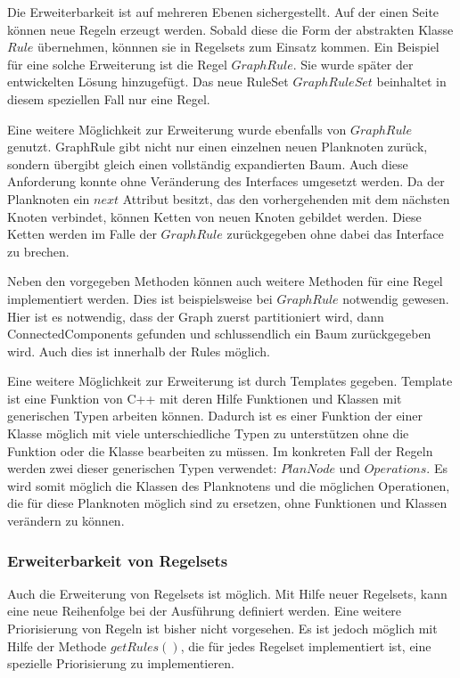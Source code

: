 Die Erweiterbarkeit ist auf mehreren Ebenen sichergestellt. Auf der einen Seite können neue Regeln erzeugt werden. Sobald diese die Form der abstrakten Klasse $Rule$ übernehmen, könnnen sie in Regelsets zum Einsatz kommen. Ein Beispiel für eine solche Erweiterung ist die Regel $GraphRule$. Sie wurde später der entwickelten Lösung hinzugefügt. Das neue RuleSet $GraphRuleSet$ beinhaltet in diesem speziellen Fall nur eine Regel.

Eine weitere Möglichkeit zur Erweiterung wurde ebenfalls von $GraphRule$ genutzt. GraphRule gibt nicht nur einen einzelnen neuen Planknoten zurück, sondern übergibt gleich einen vollständig expandierten Baum. Auch diese Anforderung konnte ohne Veränderung des Interfaces umgesetzt werden. Da der Planknoten ein $next$ Attribut besitzt, das den vorhergehenden mit dem nächsten Knoten verbindet, können Ketten von neuen Knoten gebildet werden. Diese Ketten werden im Falle der $GraphRule$ zurückgegeben ohne dabei das Interface zu brechen.

Neben den vorgegeben Methoden können auch weitere Methoden für eine Regel implementiert werden. Dies ist beispielsweise bei $GraphRule$ notwendig gewesen. Hier ist es notwendig, dass der Graph zuerst partitioniert wird, dann ConnectedComponents gefunden und schlussendlich ein Baum zurückgegeben wird. Auch dies ist innerhalb der Rules möglich.

Eine weitere Möglichkeit zur Erweiterung ist durch Templates gegeben. Template ist eine Funktion von C++ mit deren Hilfe Funktionen und Klassen mit generischen Typen arbeiten können. Dadurch ist es einer Funktion der einer Klasse möglich mit viele unterschiedliche Typen zu unterstützen ohne die Funktion oder die Klasse bearbeiten zu müssen. Im konkreten Fall der Regeln werden zwei dieser generischen Typen verwendet: $PlanNode$ und $Operations$. Es wird somit möglich die Klassen des Planknotens und die möglichen Operationen, die für diese Planknoten möglich sind zu ersetzen, ohne Funktionen und Klassen verändern zu können.

\subsubsection{Erweiterbarkeit von Regelsets}

Auch die Erweiterung von Regelsets ist möglich. Mit Hilfe neuer Regelsets, kann eine neue Reihenfolge bei der Ausführung definiert werden. Eine weitere Priorisierung von Regeln ist bisher nicht vorgesehen. Es ist jedoch möglich mit Hilfe der Methode $getRules()$, die für jedes Regelset implementiert ist, eine spezielle Priorisierung zu implementieren. 

